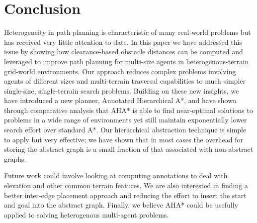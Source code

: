 \section{Conclusion} 
Heterogeneity in path planning is characteristic of many real-world problems but has received very little attention to date.
In this paper we have addressed this issue by showing how clearance-based obstacle distances can be computed and leveraged to improve path planning for multi-size agents in heterogenous-terrain grid-world environments. 
Our approach reduces complex problems involving agents of different sizes and multi-terrain traversal capabilities to much simpler single-size, single-terrain search problems.
Building on these new insights, we have introduced a new planner, Annotated Hierarchical A*,  and have shown through comparative analysis that AHA* is able to find near-optimal solutions to problems in a wide range of environments yet still maintain exponentially lower search effort over standard A*.
Our hierarchical abstraction technique is simple to apply but very effective; we have shown that in most cases the overhead for storing the abstract graph is a small fraction of that associated with non-abstract graphs.
\par \indent
Future work could involve looking at computing annotations to deal with elevation and other common terrain features. 
We are also interested in finding a better inter-edge placement approach and reducing the effort to insert the start and goal into the abstract graph.
Finally, we believe AHA* could be usefully applied to solving heterogenous multi-agent problems.
